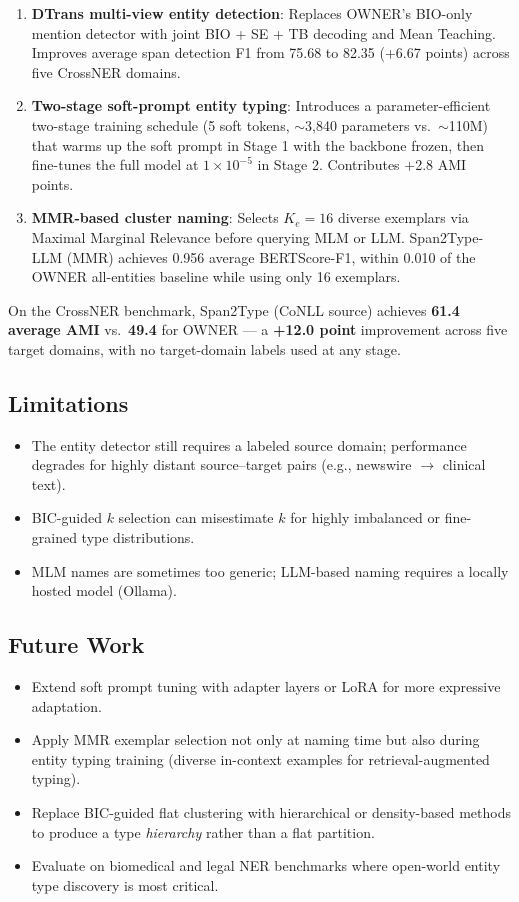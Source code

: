 \documentclass[11pt,a4paper]{article}
\begin{document}
\begin{enumerate}[noitemsep]
  \item \textbf{DTrans multi-view entity detection}: Replaces OWNER's BIO-only mention detector with joint BIO + SE + TB decoding and Mean Teaching. Improves average span detection F1 from 75.68 to 82.35 (+6.67 points) across five CrossNER domains.
  \item \textbf{Two-stage soft-prompt entity typing}: Introduces a parameter-efficient two-stage training schedule (5 soft tokens, $\sim$3,840 parameters vs.\ $\sim$110M) that warms up the soft prompt in Stage 1 with the backbone frozen, then fine-tunes the full model at $1{\times}10^{-5}$ in Stage 2. Contributes +2.8 AMI points.
  \item \textbf{MMR-based cluster naming}: Selects $K_e = 16$ diverse exemplars via Maximal Marginal Relevance before querying MLM or LLM. Span2Type-LLM (MMR) achieves 0.956 average BERTScore-F1, within 0.010 of the OWNER all-entities baseline while using only 16 exemplars.
\end{enumerate}

On the CrossNER benchmark, Span2Type (CoNLL source) achieves \textbf{61.4 average AMI} vs.\ \textbf{49.4} for OWNER — a \textbf{+12.0 point} improvement across five target domains, with no target-domain labels used at any stage.

\subsection{Limitations}

\begin{itemize}[noitemsep]
  \item The entity detector still requires a labeled source domain; performance degrades for highly distant source–target pairs (e.g., newswire $\to$ clinical text).
  \item BIC-guided $k$ selection can misestimate $k$ for highly imbalanced or fine-grained type distributions.
  \item MLM names are sometimes too generic; LLM-based naming requires a locally hosted model (Ollama).
\end{itemize}

\subsection{Future Work}

\begin{itemize}[noitemsep]
  \item Extend soft prompt tuning with adapter layers or LoRA for more expressive adaptation.
  \item Apply MMR exemplar selection not only at naming time but also during entity typing training (diverse in-context examples for retrieval-augmented typing).
  \item Replace BIC-guided flat clustering with hierarchical or density-based methods to produce a type \emph{hierarchy} rather than a flat partition.
  \item Evaluate on biomedical and legal NER benchmarks where open-world entity type discovery is most critical.
\end{itemize}
\end{document}

